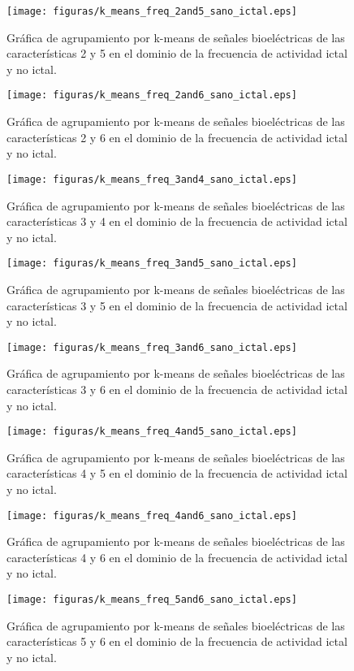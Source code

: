 \begin{figure}[H]
    \centering
    \texttt{[image: figuras/k\_means\_freq\_2and5\_sano\_ictal.eps]}
    \caption{Gráfica de agrupamiento por k-means de señales bioeléctricas de las características 2 y 5 en el dominio de la frecuencia de actividad ictal y no ictal.}
    \label{fig: k_means_freq_2_5}
\end{figure}
\begin{figure}[H]
    \centering
    \texttt{[image: figuras/k\_means\_freq\_2and6\_sano\_ictal.eps]}
    \caption{Gráfica de agrupamiento por k-means de señales bioeléctricas de las características 2 y 6 en el dominio de la frecuencia de actividad ictal y no ictal.}
    \label{fig: k_means_freq_2_6}
\end{figure}
\begin{figure}[H]
    \centering
    \texttt{[image: figuras/k\_means\_freq\_3and4\_sano\_ictal.eps]}
    \caption{Gráfica de agrupamiento por k-means de señales bioeléctricas de las características 3 y 4 en el dominio de la frecuencia de actividad ictal y no ictal.}
    \label{fig: k_means_freq_3_4}
\end{figure}
\begin{figure}[H]
    \centering
    \texttt{[image: figuras/k\_means\_freq\_3and5\_sano\_ictal.eps]}
    \caption{Gráfica de agrupamiento por k-means de señales bioeléctricas de las características 3 y 5 en el dominio de la frecuencia de actividad ictal y no ictal.}
    \label{fig: k_means_freq_3_5}
\end{figure}
\begin{figure}[H]
    \centering
    \texttt{[image: figuras/k\_means\_freq\_3and6\_sano\_ictal.eps]}
    \caption{Gráfica de agrupamiento por k-means de señales bioeléctricas de las características 3 y 6 en el dominio de la frecuencia de actividad ictal y no ictal.}
    \label{fig: k_means_freq_3_6}
\end{figure}
\begin{figure}[H]
    \centering
    \texttt{[image: figuras/k\_means\_freq\_4and5\_sano\_ictal.eps]}
    \caption{Gráfica de agrupamiento por k-means de señales bioeléctricas de las características 4 y 5 en el dominio de la frecuencia de actividad ictal y no ictal.}
    \label{fig: k_means_freq_4_5}
\end{figure}
\begin{figure}[H]
    \centering
    \texttt{[image: figuras/k\_means\_freq\_4and6\_sano\_ictal.eps]}
    \caption{Gráfica de agrupamiento por k-means de señales bioeléctricas de las características 4 y 6 en el dominio de la frecuencia de actividad ictal y no ictal.}
    \label{fig: k_means_freq_4_6}
\end{figure}
\begin{figure}[H]
    \centering
    \texttt{[image: figuras/k\_means\_freq\_5and6\_sano\_ictal.eps]}
    \caption{Gráfica de agrupamiento por k-means de señales bioeléctricas de las características 5 y 6 en el dominio de la frecuencia de actividad ictal y no ictal.}
    \label{fig: k_means_freq_5_6}
\end{figure}


